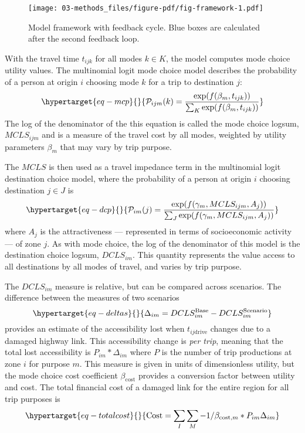\documentclass[
  letterpaper,
]{trb}
\begin{document}
\begin{figure}

{\centering \texttt{[image: 03-methods\_files/figure-pdf/fig-framework-1.pdf]}

}

\caption{\label{fig-framework}Model framework with feedback cycle. Blue
boxes are calculated after the second feedback loop.}

\end{figure}

With the travel time \(t_{ijk}\) for all modes \(k \in K\), the model
computes mode choice utility values. The multinomial logit mode choice
model describes the probability of a person at origin \(i\) choosing
mode \(k\) for a trip to destination \(j\):
\begin{equation}\protect\hypertarget{eq-mcp}{}{
\mathcal{P}_{ijm}(k) = \frac{\exp(f(\beta_{m}, t_{ijk}))}{\sum_{K}\exp(f(\beta_{m}, t_{ijk}))}
}\label{eq-mcp}\end{equation} The log of the denominator of the this
equation is called the mode choice logsum, \(MCLS_{ijm}\) and is a
measure of the travel cost by all modes, weighted by utility parameters
\(\beta_m\) that may vary by trip purpose.

The \(MCLS\) is then used as a travel impedance term in the multinomial
logit destination choice model, where the probability of a person at
origin \(i\) choosing destination \(j \in J\) is
\begin{equation}\protect\hypertarget{eq-dcp}{}{
\mathcal{P}_{im}(j) = \frac{\exp(f(\gamma_{m}, MCLS_{ijm}, A_j))}{\sum_{J}\exp(f(\gamma_{m}, MCLS_{ijm}, A_j))}
}\label{eq-dcp}\end{equation} where \(A_j\) is the attractiveness ---
represented in terms of socioeconomic activity --- of zone \(j\). As
with mode choice, the log of the denominator of this model is the
destination choice logsum, \(DCLS_{im}\). This quantity represents the
value access to all destinations by all modes of travel, and varies by
trip purpose.

The \(DCLS_{im}\) measure is relative, but can be compared across
scenarios. The difference between the measures of two scenarios
\begin{equation}\protect\hypertarget{eq-deltas}{}{
\Delta_{im} = DCLS_{im}^{\mathrm{Base}} - DCLS_{im}^{\mathrm{Scenario}}
}\label{eq-deltas}\end{equation} provides an estimate of the
accessibility lost when \(t_{ij\mathrm{drive}}\) changes due to a
damaged highway link. This accessibility change is \emph{per trip},
meaning that the total lost accessibility is \(P_{im} * \Delta_{im}\)
where \(P\) is the number of trip productions at zone \(i\) for purpose
\(m\). This measure is given in units of dimensionless utility, but the
mode choice cost coefficient \(\beta_{\mathrm{cost}}\) provides a
conversion factor between utility and cost. The total financial cost of
a damaged link for the entire region for all trip purposes is
\begin{equation}\protect\hypertarget{eq-totalcost}{}{
\mathrm{Cost} = \sum_{I}\sum_{M} -1 / \beta_{\mathrm{cost},m} * P_{im} \Delta_{im}
}\label{eq-totalcost}\end{equation}
\end{document}
